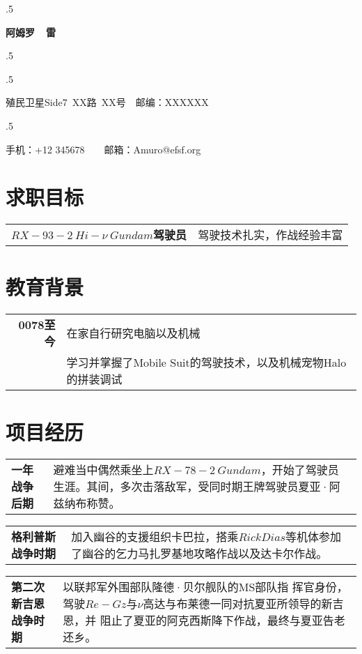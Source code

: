 \documentclass[a4paper, 10pt]{ctexart}
\begin{document}
\pagestyle{empty} 
\moveleft.5\hoffset\centerline{\huge\bf 阿姆罗~~雷} 
\moveleft.5\hoffset\centerline{}
\moveleft.5\hoffset\centerline{\small 殖民卫星Side7~XX路~XX号~~邮编：XXXXXX }
\moveleft.5\hoffset\centerline{\small 手机：+12 345678~~~~邮箱：Amuro@efsf.org}

\section{求职目标}
\noindent
\begin{tabular}{rp{11.5cm}}
\textbf{$RX-93-2~Hi-\nu~Gundam$驾驶员}&驾驶技术扎实，作战经验丰富
\end{tabular}

\section{教育背景}
\noindent
\begin{tabular}{rp{11.5cm}}
\textbf{0078至今}&在家自行研究电脑以及机械\\
&学习并掌握了Mobile Suit的驾驶技术，以及机械宠物Halo的拼装调试
\end{tabular}                                                                

\section{项目经历}
\noindent
\begin{tabular}{p{2.4cm}|p{11cm}}
\textbf{一年战争后期}&避难当中偶然乘坐上$RX-78-2~Gundam$，开始了驾驶员
生涯。其间，多次击落敌军，受同时期王牌驾驶员夏亚·阿兹纳布称赞。\\
\end{tabular}

\noindent
\begin{tabular}{p{2.4cm}|p{11cm}}
\textbf{格利普斯战争时期}&加入幽谷的支援组织卡巴拉，搭乘$Rick Dias$等机体参加了幽谷的乞力马扎罗基地攻略作战以及达卡尔作战。\\
\end{tabular}

\noindent
\begin{tabular}{p{2.4cm}|p{11cm}}
\textbf{第二次新吉恩战争时期}&以联邦军外围部队隆德·贝尔舰队的MS部队指
挥官身份，驾驶$Re-Gz$与$\nu$高达与布莱德一同对抗夏亚所领导的新吉恩，并
阻止了夏亚的阿克西斯降下作战，最终与夏亚告老还乡。
\end{tabular}
\end{document}
